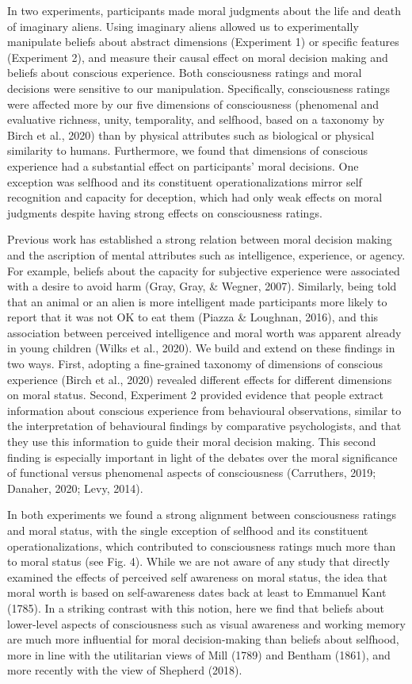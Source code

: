 \documentclass[10pt, letterpaper]{article}
\begin{document}
In two experiments, participants made moral judgments about the life and
death of imaginary aliens. Using imaginary aliens allowed us to
experimentally manipulate beliefs about abstract dimensions (Experiment
1) or specific features (Experiment 2), and measure their causal effect
on moral decision making and beliefs about conscious experience. Both
consciousness ratings and moral decisions were sensitive to our
manipulation. Specifically, consciousness ratings were affected more by
our five dimensions of consciousness (phenomenal and evaluative
richness, unity, temporality, and selfhood, based on a taxonomy by Birch
et al., 2020) than by physical attributes such as biological or physical
similarity to humans. Furthermore, we found that dimensions of conscious
experience had a substantial effect on participants' moral decisions.
One exception was selfhood and its constituent operationalizations
mirror self recognition and capacity for deception, which had only weak
effects on moral judgments despite having strong effects on
consciousness ratings.

Previous work has established a strong relation between moral decision
making and the ascription of mental attributes such as intelligence,
experience, or agency. For example, beliefs about the capacity for
subjective experience were associated with a desire to avoid harm (Gray,
Gray, \& Wegner, 2007). Similarly, being told that an animal or an alien
is more intelligent made participants more likely to report that it was
not OK to eat them (Piazza \& Loughnan, 2016), and this association
between perceived intelligence and moral worth was apparent already in
young children (Wilks et al., 2020). We build and extend on these
findings in two ways. First, adopting a fine-grained taxonomy of
dimensions of conscious experience (Birch et al., 2020) revealed
different effects for different dimensions on moral status. Second,
Experiment 2 provided evidence that people extract information about
conscious experience from behavioural observations, similar to the
interpretation of behavioural findings by comparative psychologists, and
that they use this information to guide their moral decision making.
This second finding is especially important in light of the debates over
the moral significance of functional versus phenomenal aspects of
consciousness (Carruthers, 2019; Danaher, 2020; Levy, 2014).

In both experiments we found a strong alignment between consciousness
ratings and moral status, with the single exception of selfhood and its
constituent operationalizations, which contributed to consciousness
ratings much more than to moral status (see Fig. 4). While we are not
aware of any study that directly examined the effects of perceived self
awareness on moral status, the idea that moral worth is based on
self-awareness dates back at least to Emmanuel Kant (1785). In a
striking contrast with this notion, here we find that beliefs about
lower-level aspects of consciousness such as visual awareness and
working memory are much more influential for moral decision-making than
beliefs about selfhood, more in line with the utilitarian views of Mill
(1789) and Bentham (1861), and more recently with the view of Shepherd
(2018).
\end{document}
